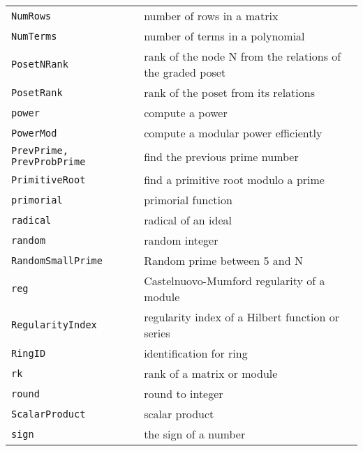 \documentclass[a4paper]{mybook}
\begin{document}
\begin{center}
\begin{longtable}{ll}
{\verb~NumRows~} &
      number of rows in a matrix\\
   
{\verb~NumTerms~} &
      number of terms in a polynomial\\
   
{\verb~PosetNRank~} &
      rank of the node N from the relations of the graded poset\\
   
{\verb~PosetRank~} &
      rank of the poset from its relations\\
   
{\verb~power~} &
      compute a power\\
   
{\verb~PowerMod~} &
      compute a modular power efficiently\\
   
{\verb~PrevPrime, PrevProbPrime~} &
      find the previous prime number\\
   
{\verb~PrimitiveRoot~} &
      find a primitive root modulo a prime\\
   
{\verb~primorial~} &
      primorial function\\
   
{\verb~radical~} &
      radical of an ideal\\
   
{\verb~random~} &
      random integer\\
   
{\verb~RandomSmallPrime~} &
      Random prime between 5 and N\\
   
{\verb~reg~} &
      Castelnuovo-Mumford regularity of a module\\
   
{\verb~RegularityIndex~} &
      regularity index of a Hilbert function or series\\
   
{\verb~RingID~} &
      identification for ring\\
   
{\verb~rk~} &
      rank of a matrix or module\\
   
{\verb~round~} &
      round to integer\\
   
{\verb~ScalarProduct~} &
      scalar product\\
   
{\verb~sign~} &
      the sign of a number\\
   

\end{longtable}
\end{center}
\end{document}
